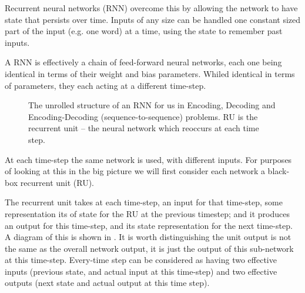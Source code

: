 \documentclass[12pt,parskip]{komatufte}\right
\begin{document}
Recurrent neural networks (RNN) overcome this by allowing the network to have state that persists over time.
Inputs of any size can be handled one constant sized part of the input (e.g. one word) at a time, using the state to remember past inputs.


A RNN is effectively a chain of feed-forward neural networks,
each one being identical in terms of their weight and bias parameters.
Whiled identical in terms of parameters, they each acting at a different time-step.


\begin{figure}
	\caption{The unrolled structure of an RNN for us in Encoding, Decoding and Encoding-Decoding (sequence-to-sequence) problems. RU is the recurrent unit -- the neural network which reoccurs at each time step.}
	
	\label{fig-rnns}
	
	\resizebox{\textwidth}{!}{}
\end{figure}


At each time-step the same network is used, with different inputs.
For purposes of looking at this in the big picture we will first consider each network a black-box recurrent unit (RU).


The recurrent unit takes at each time-step, an input for that time-step, some representation its of state for the RU at the previous timestep; and it produces an output for this time-step, and its state representation for the next time-step.
A diagram of this is shown in .
It is worth distinguishing the unit output is not the same as the overall network output, it is just the output of this sub-network at this time-step.
Every-time step can be considered as having two effective inputs (previous state, and actual input at this time-step) and two effective outputs (next state and actual output at this time step).
\end{document}
